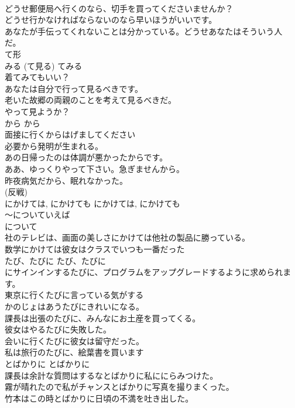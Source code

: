\documentclass[8pt]{extreport}
\begin{document}
\begin{CJK}{UTF8}{min}
\\	どうせ郵便局へ行くのなら、切手を買ってくださいませんか？  
\\	どうせ行かなければならないのなら早いほうがいいです。  
\\	あなたが手伝ってくれないことは分かっている。どうせあなたはそういう人だ。  
\\	て形
\\	みる (て見る)	てみる	
\\	着てみてもいい？  
\\	あなたは自分で行って見るべきです。   
\\	老いた故郷の両親のことを考えて見るべきだ。   
\\	やって見ようか？  
\\	から	から	
\\	面接に行くからはげましてください  
\\	必要から発明が生まれる。  
\\	あの日帰ったのは体調が悪かったからです。  
\\	ああ、ゆっくりやって下さい。急ぎませんから。  
\\	昨夜病気だから、眠れなかった。  
\\	(反戦)
\\	にかけては, にかけても	にかけては, にかけても	
\\	〜についていえば	
\\	について	
\\	社のテレビは、画面の美しさにかけては他社の製品に勝っている。  
\\	数学にかけては彼女はクラスでいつも一番だった  
\\	たび、たびに	たび、たびに	
\\	にサインインするたびに、プログラムをアップグレードするように求められます。   
\\	東京に行くたびに言っている気がする  
\\	かのじょはあうたびにきれいになる。  
\\	課長は出張のたびに、みんなにお土産を買ってくる。  
\\	彼女はやるたびに失敗した。   
\\	会いに行くたびに彼女は留守だった。   
\\	私は旅行のたびに、絵葉書を買います  
\\	とばかりに	とばかりに	
\\	課長は余計な質問はするなとばかりに私ににらみつけた。   
\\	霧が晴れたので私がチャンスとばかりに写真を撮りまくった。   
\\	竹本はこの時とばかりに日頃の不満を吐き出した。   

\end{CJK}
\end{document}
